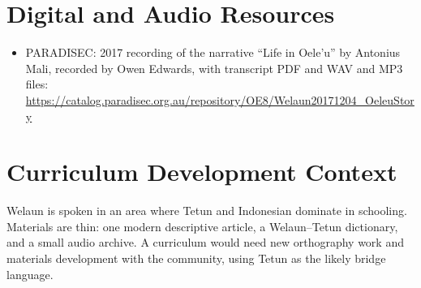 \documentclass[12pt]{article}
\begin{document}
\section{Digital and Audio Resources}
\begin{itemize}
\item PARADISEC: 2017 recording of the narrative ``Life in Oele'u'' by Antonius Mali, recorded by Owen Edwards, with transcript PDF and WAV and MP3 files: \url{https://catalog.paradisec.org.au/repository/OE8/Welaun20171204_OeleuStory}
\end{itemize}

\section{Curriculum Development Context}
Welaun is spoken in an area where Tetun and Indonesian dominate in schooling. Materials are thin: one modern descriptive article, a Welaun--Tetun dictionary, and a small audio archive. A curriculum would need new orthography work and materials development with the community, using Tetun as the likely bridge language.
\end{document}
